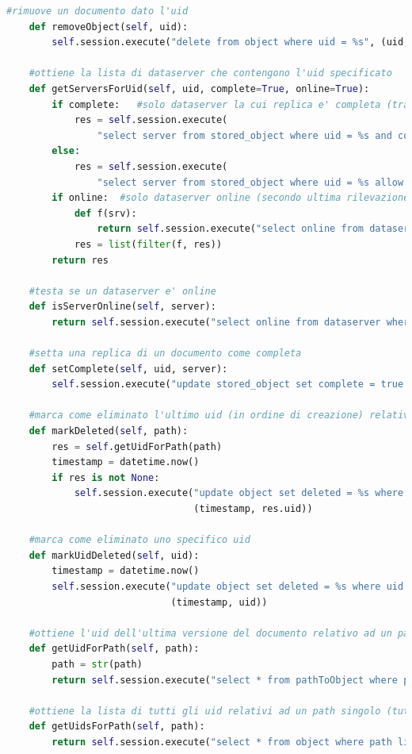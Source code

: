\documentclass[11pt,a4paper,english]{article}
\begin{document}
\begin{lstlisting}[language=Python, title=Codice]
    #rimuove un documento dato l'uid
    def removeObject(self, uid):
        self.session.execute("delete from object where uid = %s", (uid, ))

    #ottiene la lista di dataserver che contengono l'uid specificato
    def getServersForUid(self, uid, complete=True, online=True):
        if complete:   #solo dataserver la cui replica e' completa (trasferita completamente e validata)
            res = self.session.execute(
                "select server from stored_object where uid = %s and complete = true allow filtering", (uid, )).all()
        else:
            res = self.session.execute(
                "select server from stored_object where uid = %s allow filtering", (uid, )).all()
        if online:  #solo dataserver online (secondo ultima rilevazione)
            def f(srv):
                return self.session.execute("select online from dataserver where server = %s", (srv.server, )).one().online
            res = list(filter(f, res))
        return res

    #testa se un dataserver e' online
    def isServerOnline(self, server):
        return self.session.execute("select online from dataserver where server = %s", (server, )).one().online

    #setta una replica di un documento come completa
    def setComplete(self, uid, server):
        self.session.execute("update stored_object set complete = true where uid = %s and server = %s", (uid, server))

    #marca come eliminato l'ultimo uid (in ordine di creazione) relativo ad un path singolo specificato.
    def markDeleted(self, path):
        res = self.getUidForPath(path)
        timestamp = datetime.now()
        if res is not None:
            self.session.execute("update object set deleted = %s where uid = %s",
                                 (timestamp, res.uid))

    #marca come eliminato uno specifico uid
    def markUidDeleted(self, uid):
        timestamp = datetime.now()
        self.session.execute("update object set deleted = %s where uid = %s",
                             (timestamp, uid))

    #ottiene l'uid dell'ultima versione del documento relativo ad un path singolo
    def getUidForPath(self, path):
        path = str(path)
        return self.session.execute("select * from pathToObject where path = %s", (path, )).one()

    #ottiene la lista di tutti gli uid relativi ad un path singolo (tutte le versioni di un documento)
    def getUidsForPath(self, path):
        return self.session.execute("select * from object where path like %s", (path, )).all()


\end{lstlisting}
\end{document}
